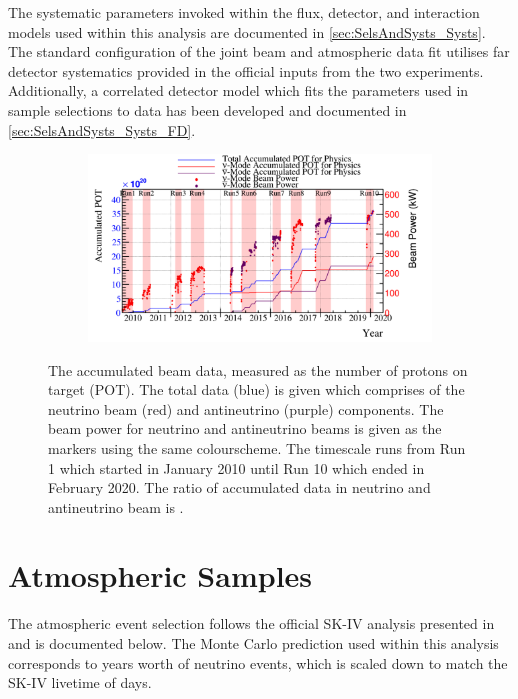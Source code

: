 The systematic parameters invoked within the flux, detector, and interaction models used within this analysis are documented in \autoref{sec:SelsAndSysts_Systs}. The standard configuration of the joint beam and atmospheric data fit utilises far detector systematics provided in the official inputs from the two experiments. Additionally, a correlated detector model which fits the parameters used in sample selections to data has been developed and documented in \autoref{sec:SelsAndSysts_Systs_FD}.

\begin{figure}[h]
  \begin{subfigure}[t]{\textwidth}
    \includegraphics[width=\textwidth, trim={0mm 0mm 0mm 0mm}, clip,page=1]{Figures/Selections/BeamPowerAndPOT.pdf}
  \end{subfigure}
  \caption{The accumulated beam data, measured as the number of protons on target (POT). The total data (blue) is given which comprises of the neutrino beam (red) and antineutrino (purple) components. The beam power for neutrino and antineutrino beams is given as the markers using the same colourscheme. The timescale runs from Run 1 which started in January 2010 until Run 10 which ended in February 2020. The ratio of accumulated data in neutrino and antineutrino beam is .}
  \label{fig:SelsAndSysts_Beam_PowerAndPOT}
\end{figure}

\newpage
\section{Atmospheric Samples}
\label{sec:SelsAndSysts_Sels_Atms}

The atmospheric event selection follows the official SK-IV analysis presented in \cite{Jiang2019-iw} and is documented below. The Monte Carlo prediction used within this analysis corresponds to  years worth of neutrino events, which is scaled down to match the SK-IV livetime of  days.

